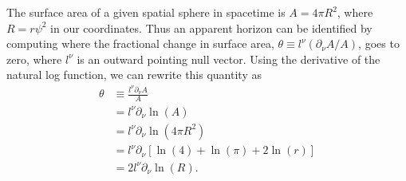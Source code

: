 \documentclass[12pt]{article}
\numberwithin{equation}{section}
\begin{document}
The surface area of a given spatial sphere in spacetime is $A = 4 \pi R^2$, where $R = r \psi^2$ in our coordinates.  Thus an apparent horizon can be identified by computing where the fractional change in surface area, $\theta \equiv l^\nu (\partial_\nu A / A)$, goes to zero, where $l^\nu$ is an outward pointing null vector.  Using the derivative of the natural log function, we can rewrite this quantity as
\begin{equation} \label{eq:apparent_horiz_defn}
\begin{aligned}
\theta &\equiv \frac{l^\nu \partial_\nu A}{A} \\
&= l^\nu \partial_\nu \ln(A) \\
&= l^\nu \partial_\nu \ln(4 \pi R^2) \\
&= l^\nu \partial_\nu [\ln(4) + \ln(\pi) + 2 \ln(r)] \\
&= 2 l^\nu \partial_\nu \ln(R).
\end{aligned}
\end{equation}
\end{document}

